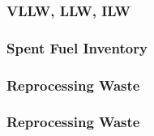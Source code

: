 
\begin{frame}[fragile]
        \frametitle{VLLW, LLW, ILW}
                
\end{frame}

\begin{frame}[fragile]
        \frametitle{Spent Fuel Inventory}
                
\end{frame}


\begin{frame}[fragile]
        \frametitle{Reprocessing Waste}
                
\end{frame}

\begin{frame}[fragile]
        \frametitle{Reprocessing Waste}
                
\end{frame}

